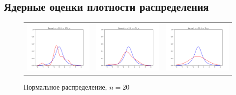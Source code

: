 \subsection{Ядерные оценки плотности распределения}
	\begin{figure}[H]
		\centering
			\begin{tabular}{ccc}
			\includegraphics[width=55mm, height =0.25\textheight]{pics/ker_n_20_1.png}
			&
			\includegraphics[width=55mm, height =0.25\textheight]{pics/ker_n_20_2.png}
			&
			\includegraphics[width=55mm, height =0.25\textheight]{pics/ker_n_20_3.png}
			\end{tabular}
		\caption{Нормальное распределение, $n = 20$}
		\label{fig:normal}
	\end{figure}

